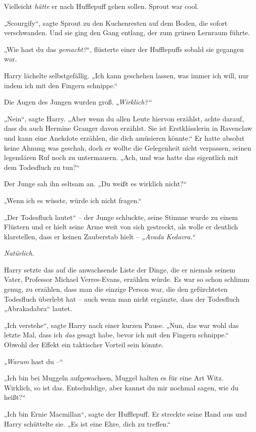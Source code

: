 Vielleicht \emph{hätte} er nach Hufflepuff gehen sollen. Sprout war cool. 

„Scourgify“, sagte Sprout zu den Kuchenresten auf dem Boden, die sofort verschwanden. Und sie ging den Gang entlang, der zum grünen Lernraum führte. 

„Wie hast du das \emph{gemacht?}“, flüsterte einer der Hufflepuffs sobald sie gegangen war. 

Harry lächelte selbstgefällig. „Ich kann geschehen lassen, was immer ich will, nur indem ich mit den Fingern schnippe.“ 

Die Augen des Jungen wurden groß. \emph{„Wirklich?“} 

„Nein“, sagte Harry. „Aber wenn du allen Leute hiervon erzählst, achte darauf, dass du auch Hermine Granger davon erzählst. Sie ist Erstklässlerin in Ravenclaw und kann eine Anekdote erzählen, die dich amüsieren könnte.“ Er hatte absolut keine Ahnung was geschah, doch er wollte die Gelegenheit nicht verpassen, seinen legendären Ruf noch zu untermauern. „Ach, und was hatte das eigentlich mit dem Todesfluch zu tun?“ 

Der Junge sah ihn seltsam an. „Du weißt es wirklich nicht?“ 

„Wenn ich es wüsste, würde ich nicht fragen.“ 

„Der Todesfluch lautet“ – der Junge schluckte, seine Stimme wurde zu einem Flüstern und er hielt seine Arme weit von sich gestreckt, als wolle er deutlich klarstellen, dass er keinen Zauberstab hielt – \emph{„Avada Kedavra.“} 

\emph{Natürlich.} 

Harry setzte das auf die anwachsende Liste der Dinge, die er niemals seinem Vater, Professor Michael Verres-Evans, erzählen würde. Es war so schon schlimm genug, zu erzählen, dass man die einzige Person war, die den gefürchteten Todesfluch überlebt hat – auch wenn man nicht ergänzte, dass der Todesfluch „Abrakadabra“ lautet. 

„Ich verstehe“, sagte Harry nach einer kurzen Pause. „Nun, das war wohl das letzte Mal, dass ich \emph{das} gesagt habe, bevor ich mit den Fingern schnippe.“ Obwohl der Effekt ein taktischer Vorteil sein könnte. 

\emph{„Warum} hast du –“ 

„Ich bin bei Muggeln aufgewachsen, Muggel halten es für eine Art Witz. Wirklich, so ist das. Entschuldige, aber kannst du mir nochmal sagen, wie du heißt?“ 

„Ich bin Ernie Macmillan“, sagte der Hufflepuff. Er streckte seine Hand aus und Harry schüttelte sie. „Es ist eine Ehre, dich zu treffen.“ 

